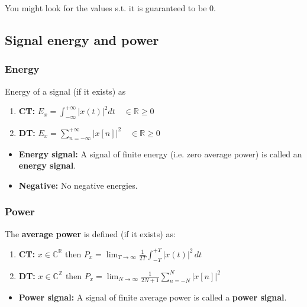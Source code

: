\begin{warning}
    You might look for the values s.t. it is guaranteed to be 0.
\end{warning}

\subsection{Signal energy and power}
    \subsubsection{Energy}
    \begin{definition}
        Energy of a signal (if it exists) as
        \begin{enumerate}
            \item \textbf{CT:} $ E_x = \int_{-\infty}^{+\infty} |x(t)|^2 dt \quad \in \mathbb{R} \geq 0 $
            \item \textbf{DT:} $ E_x = \sum_{n=-\infty}^{+\infty} |x[n]|^2 \quad \in \mathbb{R} \geq 0 $
        \end{enumerate}
        \begin{itemize}
            \item \textbf{Energy signal:} A signal of finite energy (i.e. zero average power) is called an \textbf{energy signal}.
            \item \textbf{Negative:} No negative energies.
        \end{itemize}
    \end{definition}

    \subsubsection{Power}
    \begin{definition}
        The \textbf{average power} is defined (if it exists) as: 
        \begin{enumerate}
            \item \textbf{CT:} \( x \in \mathbb{C}^\mathbb{R} \) then $P_x = \lim_{T \to \infty} \frac{1}{2T} \int_{-T}^{+T} |x(t)|^2 \, dt$
            \item \textbf{DT:} \( x \in \mathbb{C}^\mathbb{Z} \) then $P_x = \lim_{N \to \infty} \frac{1}{2N+1} \sum_{n=-N}^{N} |x[n]|^2$
        \end{enumerate}
        \begin{itemize}
            \item \textbf{Power signal:} A signal of finite average power is called a \textbf{power signal}.
        \end{itemize}
    \end{definition}
    

